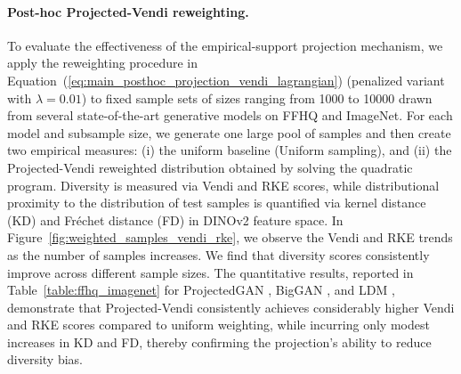 \documentclass{article}
\theoremstyle{plain}
\theoremstyle{definition}
\renewcommand{\cite}{\citep}
\begin{document}
\paragraph{Post-hoc Projected-Vendi reweighting.} To evaluate the effectiveness of the empirical-support projection mechanism, we apply the reweighting procedure in Equation~(\ref{eq:main_posthoc_projection_vendi_lagrangian}) (penalized variant with $\lambda=0.01$) to fixed sample sets of sizes ranging from 1000 to 10000 drawn from several state-of-the-art generative models on FFHQ and ImageNet. For each model and subsample size, we generate one large pool of samples and then create two empirical measures: (i) the uniform baseline (Uniform sampling), and (ii) the Projected-Vendi reweighted distribution obtained by solving the quadratic program. Diversity is measured via Vendi and RKE scores, while distributional proximity to the distribution of test samples is quantified via kernel distance (KD) and Fréchet distance (FD) in DINOv2 feature space. In Figure~\ref{fig:weighted_samples_vendi_rke}, we observe the Vendi and RKE trends as the number of samples increases. We find that diversity scores consistently improve across different sample sizes. The quantitative results, reported in Table~\ref{table:ffhq_imagenet} for ProjectedGAN \cite{sauer2021projected-gan}, BigGAN \cite{brock_large_2018}, and LDM \cite{rombach2022ldm}, demonstrate that Projected-Vendi consistently achieves considerably higher Vendi and RKE scores compared to uniform weighting, while incurring only modest increases in KD and FD, thereby confirming the projection's ability to reduce diversity bias.
\end{document}
